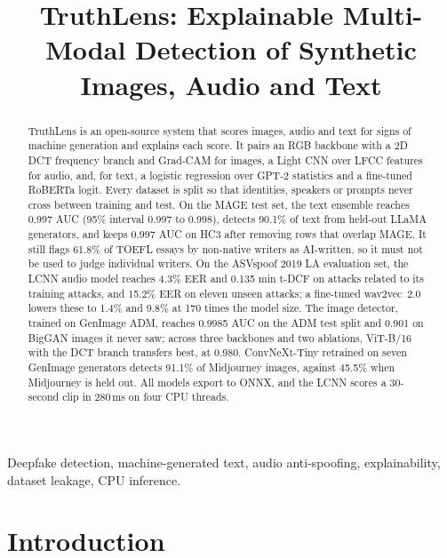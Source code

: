 \documentclass[conference]{IEEEtran}
\begin{document}
\title{TruthLens: Explainable Multi-Modal Detection of Synthetic Images, Audio and Text}

\author{
}

\maketitle

\begin{abstract}
TruthLens is an open-source system that scores images, audio and text for signs of machine generation and explains each score. It pairs an RGB backbone with a 2D DCT frequency branch and Grad-CAM for images, a Light CNN over LFCC features for audio, and, for text, a logistic regression over GPT-2 statistics and a fine-tuned RoBERTa logit. Every dataset is split so that identities, speakers or prompts never cross between training and test. On the MAGE test set, the text ensemble reaches 0.997 AUC (95\% interval 0.997 to 0.998), detects 90.1\% of text from held-out LLaMA generators, and keeps 0.997 AUC on HC3 after removing rows that overlap MAGE. It still flags 61.8\% of TOEFL essays by non-native writers as AI-written, so it must not be used to judge individual writers. On the ASVspoof 2019 LA evaluation set, the LCNN audio model reaches 4.3\% EER and 0.135 min t-DCF on attacks related to its training attacks, and 15.2\% EER on eleven unseen attacks; a fine-tuned wav2vec~2.0 lowers these to 1.4\% and 9.8\% at 170 times the model size. The image detector, trained on GenImage ADM, reaches 0.9985 AUC on the ADM test split and 0.901 on BigGAN images it never saw; across three backbones and two ablations, ViT-B/16 with the DCT branch transfers best, at 0.980. ConvNeXt-Tiny retrained on seven GenImage generators detects 91.1\% of Midjourney images, against 45.5\% when Midjourney is held out. All models export to ONNX, and the LCNN scores a 30-second clip in 280\,ms on four CPU threads.
\end{abstract}

\begin{IEEEkeywords}
Deepfake detection, machine-generated text, audio anti-spoofing, explainability, dataset leakage, CPU inference.
\end{IEEEkeywords}

\section{Introduction}
\end{document}
